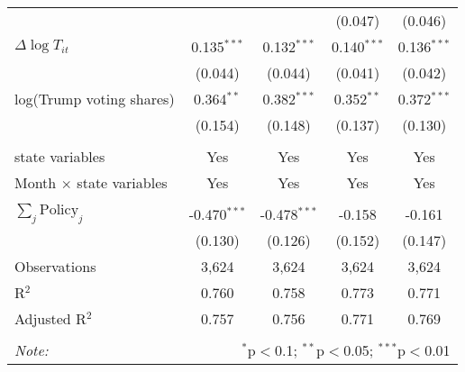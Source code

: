 \begin{tabular}{@{\extracolsep{1pt}}lcccc}
  &  &  & (0.047) & (0.046) \\ 
  $\Delta \log T_{it}$ & 0.135$^{***}$ & 0.132$^{***}$ & 0.140$^{***}$ & 0.136$^{***}$ \\ 
  & (0.044) & (0.044) & (0.041) & (0.042) \\ 
  log(Trump voting shares) & 0.364$^{**}$ & 0.382$^{***}$ & 0.352$^{**}$ & 0.372$^{***}$ \\ 
  & (0.154) & (0.148) & (0.137) & (0.130) \\ 
 \hline \\[-1.8ex] 
state variables & Yes & Yes & Yes & Yes \\ 
Month $\times$ state variables & Yes & Yes & Yes & Yes \\ 
\hline \\[-1.8ex] 
$\sum_j \mathrm{Policy}_j$ & -0.470$^{***}$ & -0.478$^{***}$ & -0.158 & -0.161 \\ 
 & (0.130) & (0.126) & (0.152) & (0.147) \\ 
Observations & 3,624 & 3,624 & 3,624 & 3,624 \\ 
R$^{2}$ & 0.760 & 0.758 & 0.773 & 0.771 \\ 
Adjusted R$^{2}$ & 0.757 & 0.756 & 0.771 & 0.769 \\ 
\hline 
\hline \\[-1.8ex] 
\textit{Note:}  & \multicolumn{4}{r}{$^{*}$p$<$0.1; $^{**}$p$<$0.05; $^{***}$p$<$0.01} \\ 
\end{tabular} 
